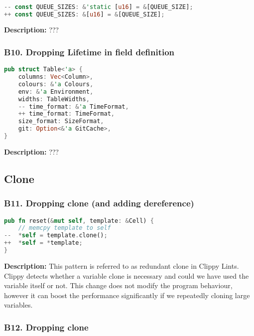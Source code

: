 \begin{lstlisting}[language=Rust, style=colouredRust, label={l3}]

-- const QUEUE_SIZES: &'static [u16] = &[QUEUE_SIZE];
++ const QUEUE_SIZES: &[u16] = &[QUEUE_SIZE];

\end{lstlisting}

\noindent \textbf{Description:} ???

\subsubsection{B10. Dropping Lifetime in field definition}

\begin{lstlisting}[language=Rust, style=colouredRust, label={l3}]
pub struct Table<'a> {
    columns: Vec<Column>,
    colours: &'a Colours,
    env: &'a Environment,
    widths: TableWidths,
    -- time_format: &'a TimeFormat,
    ++ time_format: TimeFormat,
    size_format: SizeFormat,
    git: Option<&'a GitCache>,
}
\end{lstlisting}

\noindent \textbf{Description:} ???

\subsection{Clone}
\subsubsection{B11. Dropping clone (and adding dereference)}

\begin{lstlisting}[language=Rust, style=colouredRust, label={l3}]
pub fn reset(&mut self, template: &Cell) {
    // memcpy template to self
--  *self = template.clone();
++  *self = *template;
}
\end{lstlisting}

\noindent \textbf{Description:} This pattern is referred to as redundant clone in Clippy Lints. Clippy detects whether a variable clone is necessary and could we have used the variable itself or not. This change does not modify the program behaviour, however it can boost the performance significantly if we repeatedly cloning large variables. 

\subsubsection{B12. Dropping clone}

